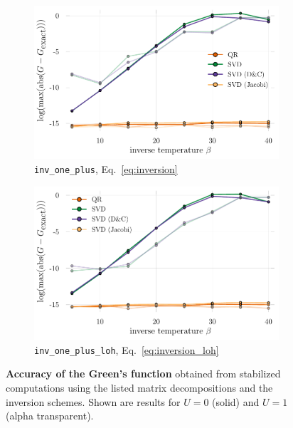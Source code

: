 \documentclass[submission, Phys]{SciPost}
\begin{document}
\begin{figure}
	\centering
	\begin{subfigure}{0.48\textwidth}
	\includegraphics[width=\textwidth]{figures/accuracy_greens_svd_regularinv.pdf}
\caption{\texttt{inv\_one\_plus}, Eq.~\eqref{eq:inversion} \label{fig:greens_accuracy_regularinv}}
	\end{subfigure}%
	\hspace{10pt}
	\begin{subfigure}{0.48\textwidth}
	\includegraphics[width=\textwidth]{figures/accuracy_greens_svd_loh.pdf}
\caption{\texttt{inv\_one\_plus\_loh}, Eq.~\ref{eq:inversion_loh} \label{fig:greens_accuracy_loh}}
	\end{subfigure}
	\vspace{5pt}
	\caption{\textbf{Accuracy of the Green's function} obtained from stabilized computations using the listed matrix decompositions and the inversion schemes. Shown are results for $U=0$ (solid) and $U=1$ (alpha transparent).}
\end{figure}
\end{document}
